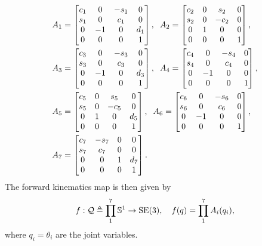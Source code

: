 \begin{align}
  \begin{split}
    A_1 &= \begin{bmatrix} c_1 & 0 & -s_1 & 0 \\ s_1 & 0 & c_1 & 0 \\ 0 & -1 & 0 & d_1 \\ 0 & 0 & 0 & 1\end{bmatrix}, \;\;
    A_2 = \begin{bmatrix} c_2 & 0 & s_2 & 0 \\ s_2 & 0 & -c_2 & 0 \\ 0 & 1 & 0 & 0 \\ 0 & 0 & 0 & 1\end{bmatrix}, \\
    A_3 &= \begin{bmatrix} c_3 & 0 & -s_3 & 0 \\ s_3 & 0 & c_3 & 0 \\ 0 & -1 & 0 & d_3 \\ 0 & 0 & 0 & 1\end{bmatrix}, \;\;
    A_4 = \begin{bmatrix} c_4 & 0 & -s_4 & 0 \\ s_4 & 0 & c_4 & 0 \\ 0 & -1 & 0 & 0 \\ 0 & 0 & 0 & 1\end{bmatrix}, \\
    A_5 &= \begin{bmatrix} c_5 & 0 & s_5 & 0 \\ s_5 & 0 & -c_5 & 0 \\ 0 & 1 & 0 & d_5 \\ 0 & 0 & 0 & 1\end{bmatrix}, \;\;
    A_6 = \begin{bmatrix} c_6 & 0 & -s_6 & 0 \\ s_6 & 0 & c_6 & 0 \\ 0 & -1 & 0 & 0 \\ 0 & 0 & 0 & 1\end{bmatrix}, \\
    A_7 &= \begin{bmatrix} c_7 & -s_7 & 0 & 0 \\ s_7 & c_7 & 0 & 0 \\ 0 & 0 & 1 & d_7 \\ 0 & 0 & 0 & 1\end{bmatrix}. \\
  \end{split}
\end{align}
%
The forward kinematics map is then given by \[ f: \mathcal{Q} \triangleq \prod_1^7
\mathbb{S}^1 \rightarrow \mathrm{SE}(3), \quad f(q) = \prod_1^7 A_i(q_i), \]
%
where $q_i = \theta_i$ are the joint variables.

